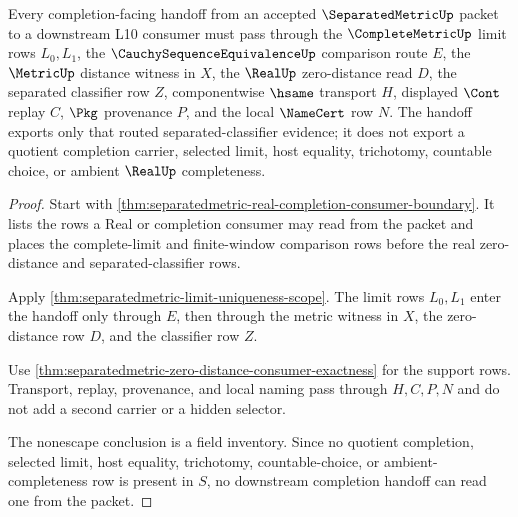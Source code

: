 \begin{theorem}
\label{thm:separatedmetric-completion-handoff-nonescape}
Every completion-facing handoff from an accepted $\SeparatedMetricUp$ packet to a downstream L10 consumer must pass through the $\CompleteMetricUp$ limit rows $L_0,L_1$, the $\CauchySequenceEquivalenceUp$ comparison route $E$, the $\MetricUp$ distance witness in $X$, the $\RealUp$ zero-distance read $D$, the separated classifier row $Z$, componentwise $\hsame$ transport $H$, displayed $\Cont$ replay $C$, $\Pkg$ provenance $P$, and the local $\NameCert$ row $N$. The handoff exports only that routed separated-classifier evidence; it does not export a quotient completion carrier, selected limit, host equality, trichotomy, countable choice, or ambient $\RealUp$ completeness.
\end{theorem}
\begin{proof}
Start with \autoref{thm:separatedmetric-real-completion-consumer-boundary}. It lists the rows a Real or completion consumer may read from the packet and places the complete-limit and finite-window comparison rows before the real zero-distance and separated-classifier rows.

Apply \autoref{thm:separatedmetric-limit-uniqueness-scope}. The limit rows $L_0,L_1$ enter the handoff only through $E$, then through the metric witness in $X$, the zero-distance row $D$, and the classifier row $Z$.

Use \autoref{thm:separatedmetric-zero-distance-consumer-exactness} for the support rows. Transport, replay, provenance, and local naming pass through $H,C,P,N$ and do not add a second carrier or a hidden selector.

The nonescape conclusion is a field inventory. Since no quotient completion, selected limit, host equality, trichotomy, countable-choice, or ambient-completeness row is present in $S$, no downstream completion handoff can read one from the packet.
\end{proof}

